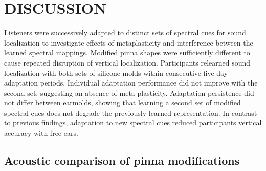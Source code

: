 \newpage
\section{DISCUSSION}\label{sec1}%

Listeners were successively adapted to distinct sets of spectral cues for sound localization to investigate effects of metaplasticity and interference between the learned spectral mappings. Modified pinna shapes were sufficiently different to cause repeated disruption of vertical localization. Participants relearned sound localization with both sets of silicone molds within consecutive five-day adaptation periods. Individual adaptation performance did not improve with the second set, suggesting an absence of meta-plasticity. Adaptation persistence did not differ between earmolds, showing that learning a second set of modified spectral cues does not degrade the previously learned representation. In contrast to previous findings, adaptation to new spectral cues reduced participants vertical accuracy with free ears.

\subsection{Acoustic comparison of pinna modifications}

